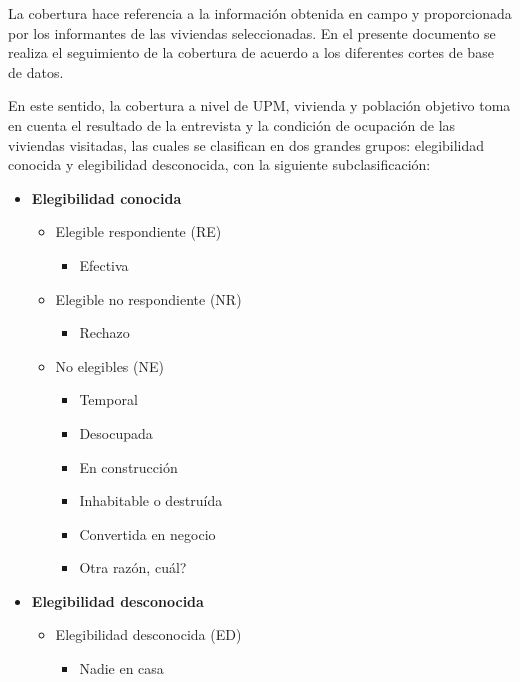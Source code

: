 \documentclass[
]{article}
\providecommand{\tightlist}{%
  \setlength{\itemsep}{0pt}\setlength{\parskip}{0pt}}
\begin{document}
La cobertura hace referencia a la información obtenida en campo y
proporcionada por los informantes de las viviendas seleccionadas. En el
presente documento se realiza el seguimiento de la cobertura de acuerdo
a los diferentes cortes de base de datos.

En este sentido, la cobertura a nivel de UPM, vivienda y población
objetivo toma en cuenta el resultado de la entrevista y la condición de
ocupación de las viviendas visitadas, las cuales se clasifican en dos
grandes grupos: elegibilidad conocida y elegibilidad desconocida, con la
siguiente subclasificación:

\begin{itemize}
\item
  \textbf{Elegibilidad conocida}

  \begin{itemize}
  \tightlist
  \item
    Elegible respondiente (RE)

    \begin{itemize}
    \tightlist
    \item
      Efectiva
    \end{itemize}
  \item
    Elegible no respondiente (NR)

    \begin{itemize}
    \tightlist
    \item
      Rechazo
    \end{itemize}
  \item
    No elegibles (NE)

    \begin{itemize}
    \tightlist
    \item
      Temporal
    \item
      Desocupada
    \item
      En construcción
    \item
      Inhabitable o destruída
    \item
      Convertida en negocio
    \item
      Otra razón, cuál?
    \end{itemize}
  \end{itemize}
\item
  \textbf{Elegibilidad desconocida}

  \begin{itemize}
  \tightlist
  \item
    Elegibilidad desconocida (ED)

    \begin{itemize}
    \tightlist
    \item
      Nadie en casa
    \end{itemize}
  \end{itemize}
\end{itemize}
\end{document}
